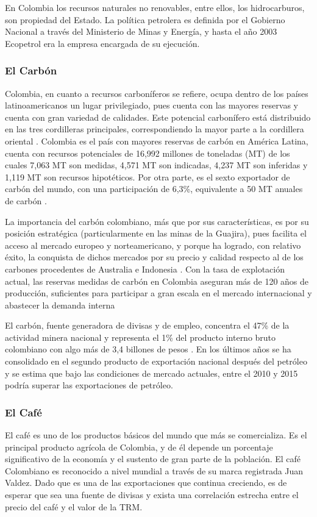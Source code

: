 En Colombia los recursos naturales no renovables, entre ellos, los hidrocarburos, son propiedad del Estado. La política petrolera es definida por el Gobierno Nacional a través del Ministerio de Minas y Energía, y hasta el año 2003 Ecopetrol era la empresa encargada de su ejecución. 

\subsubsection{El Carbón}
Colombia, en cuanto a recursos carboníferos se refiere, ocupa dentro de los países latinoamericanos un lugar privilegiado, pues cuenta con las mayores reservas y cuenta con gran variedad de calidades. Este potencial carbonífero está distribuido en las tres cordilleras principales, correspondiendo la mayor parte a la cordillera oriental \cite{cardenas}. Colombia es el país con mayores reservas de carbón en América Latina, cuenta con recursos potenciales de 16,992 millones de toneladas (MT) de los cuales 7,063 MT son medidas, 4,571 MT son indicadas, 4,237 MT son inferidas y 1,119 MT son recursos hipotéticos. Por otra parte, es el sexto exportador de carbón del mundo, con una participación de 6,3\%, equivalente a 50 MT anuales de carbón \cite{carbonMain}. 

La importancia del carbón colombiano, más que por sus características, es por su posición estratégica (particularmente en las minas de la Guajira), pues facilita el acceso al mercado europeo y norteamericano, y porque ha logrado, con relativo éxito, la conquista de dichos mercados por su precio y calidad respecto al de los carbones procedentes de Australia e Indonesia \cite{cardenas}. Con la tasa de explotación actual, las reservas medidas de carbón en Colombia aseguran más de 120 años de producción, suficientes para participar a gran escala en el mercado internacional y abastecer la demanda interna \cite{carbonMain}

El carbón, fuente generadora de divisas y de empleo, concentra el 47\% de la actividad minera nacional y representa el 1\% del producto interno bruto colombiano con algo más de 3,4 billones de pesos \cite{carbonMain}. En los últimos años se ha consolidado en el segundo producto de exportación nacional  después del petróleo y se estima que bajo las condiciones de mercado actuales, entre el 2010 y 2015 podría superar las exportaciones de petróleo.

\subsubsection{El Café}
El café es uno de los productos básicos del mundo que más se comercializa. Es el principal producto agrícola de Colombia, y de él depende un porcentaje significativo de la economía y el sustento de gran parte de la población. El café Colombiano es reconocido a nivel mundial a través de su marca registrada Juan Valdez. Dado que es una de las exportaciones que continua creciendo, es de esperar que sea una fuente de divisas y exista una correlación estrecha entre el precio del café y el valor de la TRM. 


